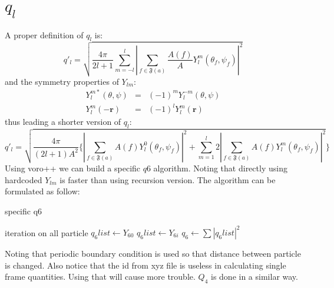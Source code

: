 \documentclass[12pt]{article}
\begin{document}
\section{$q_l$}
A proper definition of  $q_l$ \cite{mickelShortcomingsBondOrientational2013} is:
\begin{equation}
  q'_l=\sqrt{\frac{4\pi}{2l+1}\sum_{m=-l}^{l}|\sum_{f\in\mathfrak{F}(a)}\frac{A(f)}{A}Y^{m}_{l}(\theta_f,\psi_f)|^2}
\end{equation}
and the symmetry properties of $Y_{lm}$:
\begin{eqnarray*}
  Y^{m*}_{l}(\theta,\psi) &=& (-1)^mY^{-m}_{l}(\theta,\psi) \\
  Y^{m}_{l}(-\textbf{r}) &=& (-1)^lY^{m}_{l}(\textbf{r})
\end{eqnarray*}
thus leading a shorter version of $q_l$:
\begin{equation}
  q'_l=\sqrt{\frac{4\pi}{(2l+1)A^2}\{ |\sum_{f\in\mathfrak{F}(a)}A(f)Y_l^0(\theta_f,\psi_f)|^2 + \sum_{m=1}^{l}2|\sum_{f\in\mathfrak{F}(a)}A(f)Y^{m}_{l}(\theta_f,\psi_f)|^2} \}
\end{equation}
Using voro++\cite{rycroftVOROThreedimensionalVoronoi2009} we can build a specific $q6$ algorithm. Noting that directly using hardcoded $Y_{lm}$ is faster than using recursion version. The algorithm can be formulated as follow:

\begin{algorithm}
\caption{specific q6}
\label{alg:q6}
\begin{algorithmic}
\STATE iteration on all particle
        \STATE $q_6list\gets Y_{60}$
        \STATE $q_6list\gets Y_{6i}$
        \ENDFOR
    \ENDIF
        \STATE $q_6\gets\sum|q_6list|^2$
    \ENDFOR
\ENDFOR
\end{algorithmic}
\end{algorithm}

Noting that periodic boundary condition is used so that distance between particle is changed. Also notice that the id from xyz file is useless in calculating single frame quantities. Using that will cause more trouble. $Q_4$ is done in a similar way.
\end{document}
